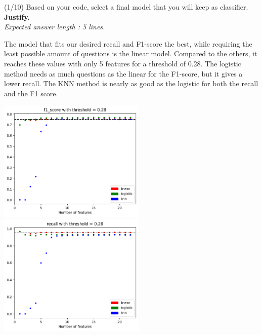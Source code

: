 \documentclass [a4paper, 11pt] {article}
\begin{document}
\begin{question}{2.3}
(1/10) Based on your code, select a final model that you will keep as classifier. \textbf{Justify.} \\
\textit{Expected answer length : 5 lines.}
\end{question}
\begin{answer} \color{blue}
The model that fits our desired recall and F1-score the best, while requiring the least possible amount of questions is the linear model. Compared to the others, it reaches these values with only 5 features for a threshold of 0.28.
The logistic method needs as much questions as the linear for the F1-score, but it gives a lower recall. The KNN method is nearly as good as the logistic for both the recall and the F1 score.
\begin{center}
    \includegraphics[width=7cm]{5_2_F.png}
    \includegraphics[width=7cm]{5_2_R.png}   
\end{center}
\end{answer}
\end{document}
